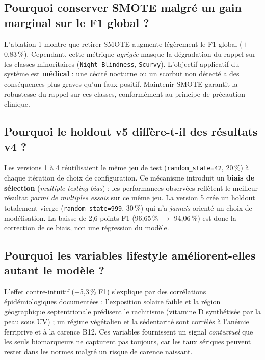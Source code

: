 \documentclass[12pt,a4paper]{article}
\begin{document}
\subsection{Pourquoi conserver SMOTE malgré un gain marginal sur le F1 global ?}

L'ablation 1 montre que retirer SMOTE augmente légèrement le F1 global
($+$0,83\,\%). Cependant, cette métrique \emph{agrégée} masque la dégradation
du rappel sur les classes minoritaires (\texttt{Night\_Blindness},
\texttt{Scurvy}). L'objectif applicatif du système est \textbf{médical} : une
cécité nocturne ou un scorbut non détecté a des conséquences plus graves qu'un
faux positif. Maintenir SMOTE garantit la robustesse du rappel sur ces classes,
conformément au principe de précaution clinique.

\subsection{Pourquoi le holdout v5 diffère-t-il des résultats v4 ?}

Les versions 1 à 4 réutilisaient le même jeu de test (\texttt{random\_state=42},
20\,\%) à chaque itération de choix de configuration. Ce mécanisme introduit un
\textbf{biais de sélection} (\emph{multiple testing bias}) : les performances
observées reflètent le meilleur résultat \emph{parmi de multiples essais} sur
ce même jeu. La version 5 crée un holdout totalement vierge
(\texttt{random\_state=999}, 30\,\%) qui n'a \emph{jamais} orienté un choix de
modélisation. La baisse de 2,6 points F1 (96,65\,\% $\to$ 94,06\,\%) est donc la
correction de ce biais, non une régression du modèle.

\subsection{Pourquoi les variables lifestyle améliorent-elles autant le modèle ?}

L'effet contre-intuitif ($+$5,3\,\% F1) s'explique par des corrélations
épidémiologiques documentées : l'exposition solaire faible et la région
géographique septentrionale prédisent le rachitisme (vitamine D synthétisée par
la peau sous UV) ; un régime végétalien et la sédentarité sont corrélés à
l'anémie ferriprive et à la carence B12. Ces variables fournissent un signal
\emph{contextuel} que les seuls biomarqueurs ne capturent pas toujours, car les
taux sériques peuvent rester dans les normes malgré un risque de carence naissant.

\end{document}

